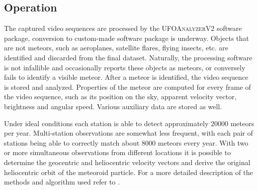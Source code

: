     \subsection{Operation} \label{iAo}
        The captured video sequences are processed by the \textsc{UFOAnalyzerV2} software package,
        conversion to custom-made software package is underway.
        Objects that are not meteors, such as aeroplanes, satellite flares, flying insects, etc.
        are identified and discarded from the final dataset. Naturally, the processing software is not
        infallible and occasionally reports these objects as meteors, or conversely fails to identify a visible meteor.
        After a meteor is identified, the video sequence is stored and analyzed.
        Properties of the meteor are computed for every frame of the video sequence,
        such as its position on the sky, apparent velocity vector, brightness and angular speed.
        Various auxiliary data are stored as well.

        Under ideal conditions each station is able to detect approximately 20000 meteors per year.
        Multi-station observations are somewhat less frequent, with each pair of stations being able
        to correctly match about 8000 meteors every year.
        With two or more simultaneous observations from different locations it is possible to determine
        the geocentric and heliocentric velocity vectors and derive the original heliocentric orbit of the meteoroid particle.
        For a more detailed description of the methods and algorithm used refer to \citet{fero?}.


